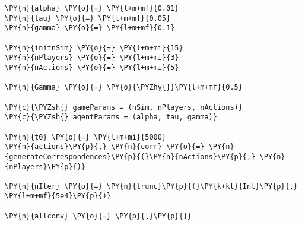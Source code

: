 \documentclass[main.tex]{subfiles}
\begin{document}
    \begin{tcolorbox}[breakable, size=fbox, boxrule=1pt, pad at break*=1mm,colback=cellbackground, colframe=cellborder]
\begin{Verbatim}[commandchars=\\\{\}]
\PY{n}{alpha} \PY{o}{=} \PY{l+m+mf}{0.01}
\PY{n}{tau} \PY{o}{=} \PY{l+m+mf}{0.05}
\PY{n}{gamma} \PY{o}{=} \PY{l+m+mf}{0.1}

\PY{n}{initnSim} \PY{o}{=} \PY{l+m+mi}{15}
\PY{n}{nPlayers} \PY{o}{=} \PY{l+m+mi}{3}
\PY{n}{nActions} \PY{o}{=} \PY{l+m+mi}{5}

\PY{n}{Gamma} \PY{o}{=} \PY{o}{\PYZhy{}}\PY{l+m+mf}{0.5}

\PY{c}{\PYZsh{} gameParams = (nSim, nPlayers, nActions)}
\PY{c}{\PYZsh{} agentParams = (alpha, tau, gamma)}

\PY{n}{t0} \PY{o}{=} \PY{l+m+mi}{5000}
\PY{n}{actions}\PY{p}{,} \PY{n}{corr} \PY{o}{=} \PY{n}{generateCorrespondences}\PY{p}{(}\PY{n}{nActions}\PY{p}{,} \PY{n}{nPlayers}\PY{p}{)}

\PY{n}{nIter} \PY{o}{=} \PY{n}{trunc}\PY{p}{(}\PY{k+kt}{Int}\PY{p}{,} \PY{l+m+mf}{5e4}\PY{p}{)}

\PY{n}{allconv} \PY{o}{=} \PY{p}{[}\PY{p}{]}
\end{Verbatim}
\end{tcolorbox}
\end{document}
